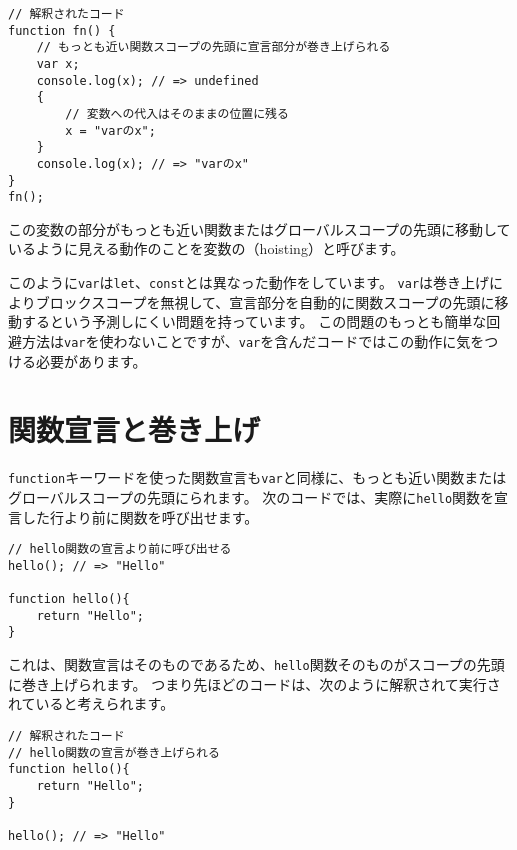 \begin{lstlisting}
// 解釈されたコード
function fn() {
    // もっとも近い関数スコープの先頭に宣言部分が巻き上げられる
    var x;
    console.log(x); // => undefined
    {
        // 変数への代入はそのままの位置に残る
        x = "varのx";
    }
    console.log(x); // => "varのx"
}
fn();
\end{lstlisting}

この変数の\textbf{}部分がもっとも近い関数またはグローバルスコープの先頭に移動しているように見える動作のことを変数の\textbf{}（hoisting）と呼びます。

このように\texttt{var}は\texttt{let}、\texttt{const}とは異なった動作をしています。
\texttt{var}は巻き上げによりブロックスコープを無視して、宣言部分を自動的に関数スコープの先頭に移動するという予測しにくい問題を持っています。
この問題のもっとも簡単な回避方法は\texttt{var}を使わないことですが、\texttt{var}を含んだコードではこの動作に気をつける必要があります。

\hypertarget{function-declaration-hoisting}{%
\section{関数宣言と巻き上げ}\label{function-declaration-hoisting}}

\texttt{function}キーワードを使った関数宣言も\texttt{var}と同様に、もっとも近い関数またはグローバルスコープの先頭に\textbf{}られます。
次のコードでは、実際に\texttt{hello}関数を宣言した行より前に関数を呼び出せます。\enlargethispage{\baselineskip}

\begin{lstlisting}
// hello関数の宣言より前に呼び出せる
hello(); // => "Hello"

function hello(){
    return "Hello";
}
\end{lstlisting}

これは、関数宣言は\textbf{}そのものであるため、\texttt{hello}関数そのものがスコープの先頭に巻き上げられます。
つまり先ほどのコードは、次のように解釈されて実行されていると考えられます。

\begin{lstlisting}
// 解釈されたコード
// hello関数の宣言が巻き上げられる
function hello(){
    return "Hello";
}

hello(); // => "Hello"
\end{lstlisting}

